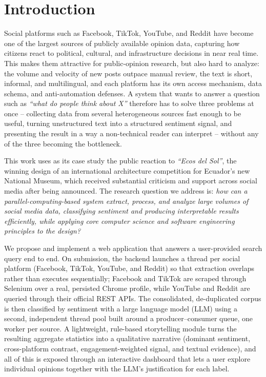 \documentclass[runningheads]{llncs}
\begin{document}
\section{Introduction}
\label{sec:intro}

Social platforms such as Facebook, TikTok, YouTube, and Reddit have become
one of the largest sources of publicly available opinion data, capturing how
citizens react to political, cultural, and infrastructure decisions in near
real time. This makes them attractive for public-opinion research, but also
hard to analyze: the volume and velocity of new posts outpace manual review,
the text is short, informal, and multilingual, and each platform has its own
access mechanism, data schema, and anti-automation defenses. A system that
wants to answer a question such as \emph{``what do people think about X''}
therefore has to solve three problems at once -- collecting data from several
heterogeneous sources fast enough to be useful, turning unstructured text
into a structured sentiment signal, and presenting the result in a way a
non-technical reader can interpret -- without any of the three becoming the
bottleneck.

This work uses as its case study the public reaction to \emph{``Ecos del
Sol''}, the winning design of an international architecture competition for
Ecuador's new National Museum, which received substantial criticism and
support across social media after being announced. The research question we
address is: \emph{how can a parallel-computing-based system extract, process,
and analyze large volumes of social media data, classifying sentiment and
producing interpretable results efficiently, while applying core computer
science and software engineering principles to the design?}

We propose and implement a web application that answers a user-provided
search query end to end. On submission, the backend launches a thread per
social platform (Facebook, TikTok, YouTube, and Reddit) so that extraction
overlaps rather than executes sequentially; Facebook and TikTok are scraped
through Selenium over a real, persisted Chrome profile, while YouTube and
Reddit are queried through their official REST APIs. The consolidated,
de-duplicated corpus is then classified by sentiment with a large language
model (LLM) using a second, independent thread pool built around a
producer--consumer queue, one worker per source. A lightweight, rule-based
storytelling module turns the resulting aggregate statistics into a
qualitative narrative (dominant sentiment, cross-platform contrast,
engagement-weighted signal, and textual evidence), and all of this is
exposed through an interactive dashboard that lets a user explore individual
opinions together with the LLM's justification for each label.
\end{document}
